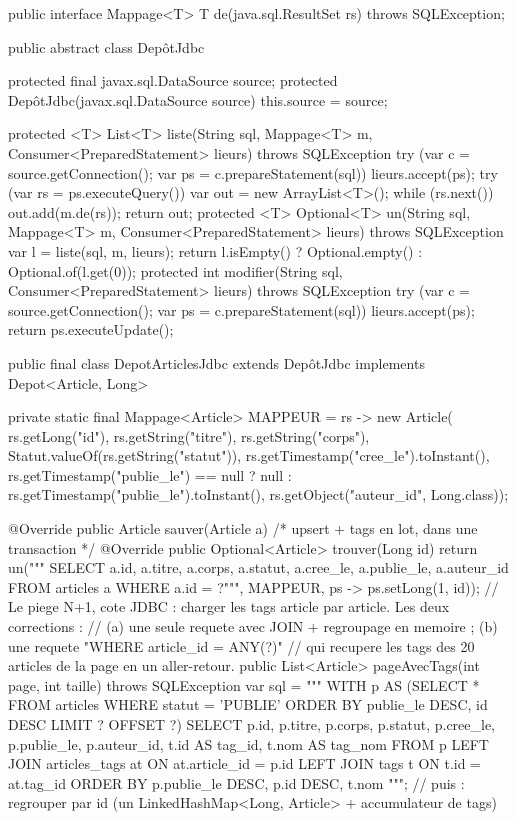 \documentclass[12pt,a4paper,twoside,openright]{book}
\begin{document}
\begin{codejava}
public interface Mappage<T> { T de(java.sql.ResultSet rs) throws SQLException; }

public abstract class Dep\^otJdbc {
    protected final javax.sql.DataSource source;
    protected Dep\^otJdbc(javax.sql.DataSource source) { this.source = source; }

    protected <T> List<T> liste(String sql, Mappage<T> m, Consumer<PreparedStatement> lieurs) throws SQLException {
        try (var c = source.getConnection(); var ps = c.prepareStatement(sql)) {
            lieurs.accept(ps);
            try (var rs = ps.executeQuery()) {
                var out = new ArrayList<T>();
                while (rs.next()) { out.add(m.de(rs)); }
                return out;
            }
        }
    }
    protected <T> Optional<T> un(String sql, Mappage<T> m, Consumer<PreparedStatement> lieurs) throws SQLException {
        var l = liste(sql, m, lieurs);
        return l.isEmpty() ? Optional.empty() : Optional.of(l.get(0));
    }
    protected int modifier(String sql, Consumer<PreparedStatement> lieurs) throws SQLException {
        try (var c = source.getConnection(); var ps = c.prepareStatement(sql)) {
            lieurs.accept(ps);
            return ps.executeUpdate();
        }
    }
}

public final class DepotArticlesJdbc extends Dep\^otJdbc implements Depot<Article, Long> {
    private static final Mappage<Article> MAPPEUR = rs -> new Article(
            rs.getLong("id"), rs.getString("titre"), rs.getString("corps"),
            Statut.valueOf(rs.getString("statut")),
            rs.getTimestamp("cree_le").toInstant(),
            rs.getTimestamp("publie_le") == null ? null : rs.getTimestamp("publie_le").toInstant(),
            rs.getObject("auteur_id", Long.class));

    @Override public Article sauver(Article a) { /* upsert + tags en lot, dans une transaction */ }
    @Override public Optional<Article> trouver(Long id) {
        return un("""
                SELECT a.id, a.titre, a.corps, a.statut, a.cree_le, a.publie_le, a.auteur_id
                FROM articles a WHERE a.id = ?""", MAPPEUR, ps -> ps.setLong(1, id));
    }
    // Le piege N+1, cote JDBC : charger les tags article par article. Les deux corrections :
    //  (a) une seule requete avec JOIN + regroupage en memoire ; (b) une requete "WHERE article_id = ANY(?)"
    //      qui recupere les tags des 20 articles de la page en un aller-retour.
    public List<Article> pageAvecTags(int page, int taille) throws SQLException {
        var sql = """
            WITH p AS (SELECT * FROM articles WHERE statut = 'PUBLIE'
                       ORDER BY publie_le DESC, id DESC LIMIT ? OFFSET ?)
            SELECT p.id, p.titre, p.corps, p.statut, p.cree_le, p.publie_le, p.auteur_id,
                   t.id AS tag_id, t.nom AS tag_nom
            FROM p LEFT JOIN articles_tags at ON at.article_id = p.id
                   LEFT JOIN tags t ON t.id = at.tag_id
            ORDER BY p.publie_le DESC, p.id DESC, t.nom
            """;
        // puis : regrouper par id (un LinkedHashMap<Long, Article> + accumulateur de tags)
    }
}
\end{codejava}
\end{document}
